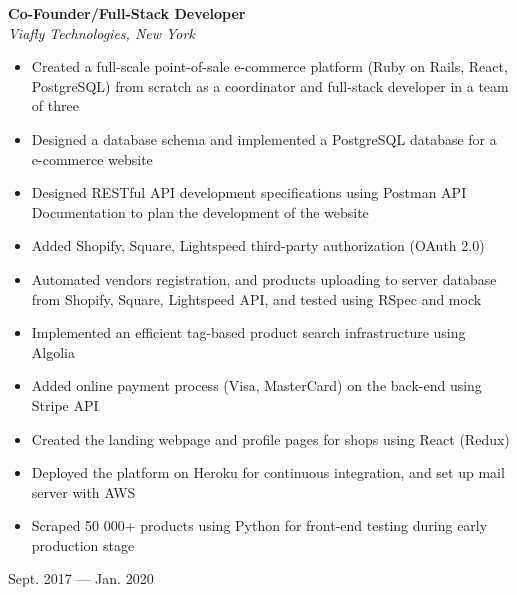 \documentclass[9pt]{extarticle}
\begin{document}
\begin{minipage}[t]{0.8\linewidth}
\begin{flushleft}
\textbf{Co-Founder/Full-Stack Developer}\\
\textit{Viafly Technologies, New York}
\begin{itemize}
    \item Created a full-scale point-of-sale e-commerce platform
		(Ruby on Rails, React, PostgreSQL)
        from scratch as a coordinator and full-stack developer
		in a team of three
    \item Designed a database schema and implemented a PostgreSQL database
		for a e-commerce website
    \item Designed RESTful API development specifications using
		Postman API Documentation to plan the
		development of the website
	\item Added Shopify, Square, Lightspeed third-party authorization (OAuth 2.0)
    \item
		Automated vendors registration, and products uploading
		to server database from Shopify, Square, Lightspeed API,
		and tested using RSpec and mock
    \item Implemented an efficient tag-based product search infrastructure
		using Algolia
    \item Added online payment process (Visa, MasterCard)
		on  the back-end using Stripe API
    \item Created the landing webpage
		and profile pages for shops using React (Redux)
    \item Deployed the platform on Heroku for continuous integration,
		and set up mail server with AWS
	\item Scraped 50 000+ products using Python
        for front-end testing during early production stage
\end{itemize}
\end{flushleft}
\end{minipage}
\begin{minipage}[t]{0.19\linewidth}
\begin{flushright}
	Sept. 2017 --- Jan. 2020
\end{flushright}
\end{minipage}
\end{document}
